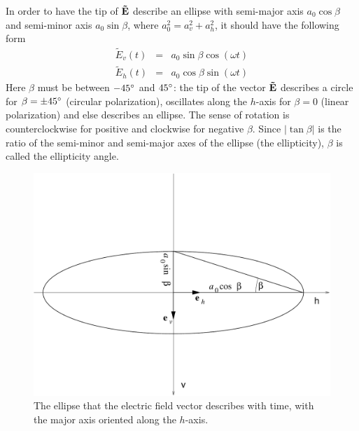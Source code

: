 In order to have the tip of $\mathbf{\tilde{E}}$ describe an ellipse with semi-major axis $a_0 \cos\beta$
and
semi-minor axis $a_0 \sin\beta$, where $a_0^2 = a_v^2 + a_h^2$, 
it should have the following form
\begin{eqnarray}
  \label{eq:polarization:ellipse_parallel}
 \tilde{E}_v (t) &=&   a_0 \sin\beta \cos(\omega t)\\
 \tilde{E}_h (t) &=&   a_0 \cos\beta \sin(\omega t)
\end{eqnarray}
Here $\beta$ must be between $-45^\circ$ and $45^\circ$: the tip of
the vector $\mathbf{\tilde{E}}$ describes a circle for $\beta = \pm
45^\circ$ (circular polarization), oscillates along the $h$-axis for
$\beta = 0$ (linear polarization) and else describes an ellipse. The
sense of rotation is counterclockwise for positive and clockwise for
negative $\beta$. Since $|\tan\beta|$ is the ratio of the semi-minor
and semi-major axes of the ellipse (the ellipticity), $\beta$ is
called the ellipticity angle.

\begin{figure}[!h]
 \begin{center}
  \begin{minipage}[c]{0.9\textwidth}
   \begin{center}
    \includegraphics*[width=0.9\hsize]{Figs/pol_ellipse_aligned}
   \end{center}
  \end{minipage}
  \begin{minipage}[c]{0.9\textwidth}
   \caption{The ellipse that the electric field vector describes with
     time, with the major axis oriented along the $h$-axis.}
   \label{fig:polarization:ellipse_aligned}
  \end{minipage}
 \end{center}
\end{figure}   

